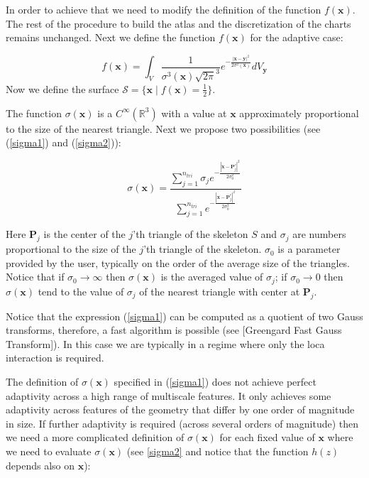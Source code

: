 \documentclass[11pt, oneside]{article}
\newcommand\bx{\boldsymbol x}
\newcommand\by{\boldsymbol y}
\newcommand\bP{\boldsymbol P}
\begin{document}
In order to achieve that we need to modify the definition of the function $f(\bx)$. The rest of the procedure to build the atlas and the discretization of the charts remains unchanged. Next we define the function $f(\bx)$ for the adaptive case:

\begin{equation}
f(\bx)=\int_{V}\frac{1}{\sigma ^3(\bx)\sqrt{2\pi}^3}e^{-\frac{|\bx-\by|^2}{2\sigma^2(\bx)}}dV_{\by}
\end{equation}
Now we define the surface $\mathcal{S}=\{\bx \mid f(\bx)=\frac{1}{2}\}$.

The function $\sigma(\bx)$ is a $C^{\infty}(\mathbb{R}^3)$ with a value at $\bx$ approximately proportional to the size of the nearest triangle. Next we propose two possibilities (see (\ref{sigma1}) and (\ref{sigma2})):

\begin{equation}\label{sigma1}
\sigma(\bx)=\frac{\sum_{j=1}^{n_{tri}}\sigma_je^{- \frac{|\bx-\bP_j^c|^2}{2\sigma^2_0}}}{\sum_{j=1}^{n_{tri}}e^{-\frac{|\bx-\bP_j^c|^2}{2\sigma^2_0}}}
\end{equation}

Here $\bP_j$ is the center of the $j$'th triangle of the skeleton $\mathit{S}$ and $\sigma_j$ are numbers proportional to the size of the $j$'th triangle of the skeleton. $\sigma_0$ is a parameter provided by the user, typically on the order of the average size of the triangles. Notice that if $\sigma_0\rightarrow \infty$ then $\sigma(\bx)$ is the averaged value of $\sigma_j$; if $\sigma_0\rightarrow 0$ then $\sigma(\bx)$ tend to the value of $\sigma_j$ of the nearest triangle with center at $\bP_j$.

Notice that the expression (\ref{sigma1}) can be computed as a quotient of two Gauss transforms, therefore, a fast algorithm is possible (see [Greengard Fast Gauss Transform]). In this case we are typically in a regime where only the loca interaction is required.

The definition of $\sigma(\bx)$ specified in (\ref{sigma1}) does not achieve perfect adaptivity across a high range of multiscale features. It only achieves some adaptivity across features of the geometry that differ by one order of magnitude in size. If further adaptivity is required (across several orders of magnitude) then we need a more complicated definition of $\sigma(\bx)$ for each fixed value of $\bx$ where we need to evaluate $\sigma(\bx)$ (see \ref{sigma2} and notice that the function $h(z)$ depends also on $\bx$):
\end{document}
